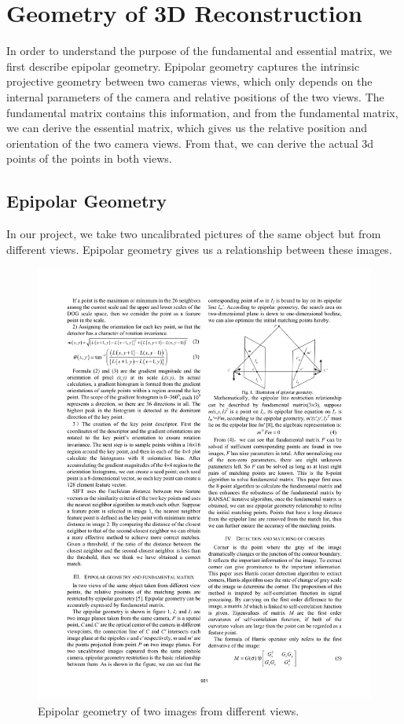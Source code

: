 \section{Geometry of 3D Reconstruction}
\label{s:fundamental}
In order to understand the purpose of the fundamental and essential matrix, we first describe epipolar geometry. Epipolar geometry captures the intrinsic projective geometry between two cameras views, which only depends on the internal parameters of the camera and relative positions of the two views. The fundamental matrix contains this information, and from the fundamental matrix, we can derive the essential matrix, which gives us the relative position and orientation of the two camera views. From that, we can derive the actual 3d points of the points in both views.

\subsection{Epipolar Geometry}
In our project, we take two uncalibrated pictures of the same object but from different views. Epipolar geometry gives us a relationship between these images.
\begin{figure}[H]
\begin{center}
\includegraphics[width=0.9\linewidth]{figures/epipolar.pdf}
\end{center}
\caption{Epipolar geometry of two images from different views.}
\label{epipolar_pic}
\end{figure}


